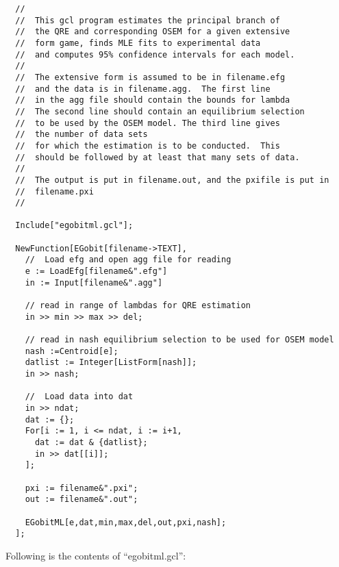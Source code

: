 {\scriptsize
\begin{verbatim}
  //
  //  This gcl program estimates the principal branch of
  //  the QRE and corresponding OSEM for a given extensive 
  //  form game, finds MLE fits to experimental data 
  //  and computes 95% confidence intervals for each model. 
  //
  //  The extensive form is assumed to be in filename.efg
  //  and the data is in filename.agg.  The first line
  //  in the agg file should contain the bounds for lambda 
  //  The second line should contain an equilibrium selection 
  //  to be used by the OSEM model. The third line gives 
  //  the number of data sets
  //  for which the estimation is to be conducted.  This 
  //  should be followed by at least that many sets of data.
  //
  //  The output is put in filename.out, and the pxifile is put in
  //  filename.pxi
  //
  
  Include["egobitml.gcl"];

  NewFunction[EGobit[filename->TEXT],
    //  Load efg and open agg file for reading
    e := LoadEfg[filename&".efg"]
    in := Input[filename&".agg"]

    // read in range of lambdas for QRE estimation
    in >> min >> max >> del;

    // read in nash equilibrium selection to be used for OSEM model
    nash :=Centroid[e];
    datlist := Integer[ListForm[nash]];
    in >> nash;

    //  Load data into dat
    in >> ndat;
    dat := {};
    For[i := 1, i <= ndat, i := i+1,
      dat := dat & {datlist};
      in >> dat[[i]];
    ];

    pxi := filename&".pxi";
    out := filename&".out";

    EGobitML[e,dat,min,max,del,out,pxi,nash];
  ];
\end{verbatim}
}

\noindent
Following is the contents of ``egobitml.gcl'':

